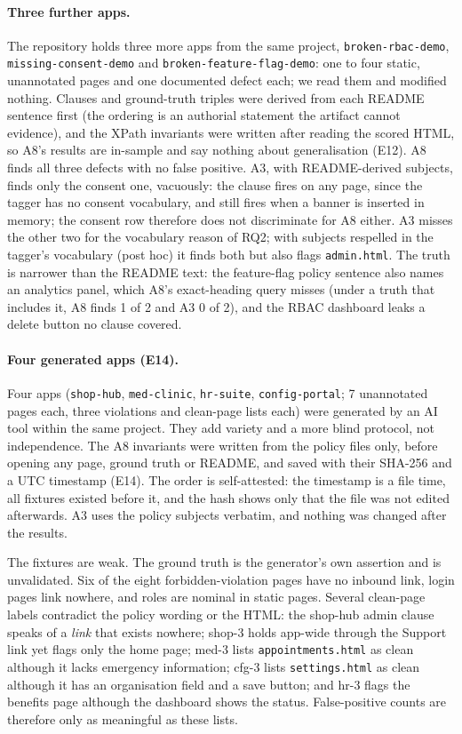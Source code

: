 \paragraph{Three further apps.}
The repository holds three more apps from the same project,
\texttt{broken-rbac-demo}, \texttt{missing-consent-demo} and
\texttt{broken-feature-flag-demo}: one to four static, unannotated pages and one
documented defect each; we read them and modified nothing. Clauses and
ground-truth triples were derived from each README sentence first (the ordering is
an authorial statement the artifact cannot evidence), and the XPath invariants were
written after reading the scored HTML, so A8's results are in-sample and say nothing
about generalisation (E12). A8 finds all three defects with no false positive. A3,
with README-derived subjects, finds only the consent one, vacuously: the clause
fires on any page, since the tagger has no consent vocabulary, and still fires when
a banner is inserted in memory; the consent row therefore does not discriminate for
A8 either. A3 misses the other two for the vocabulary reason of RQ2; with subjects
respelled in the tagger's vocabulary (post hoc) it finds both but also flags
\texttt{admin.html}. The truth is narrower than the README text: the feature-flag
policy sentence also names an analytics panel, which A8's exact-heading query
misses (under a truth that includes it, A8 finds 1 of 2 and A3 0 of 2), and the RBAC
dashboard leaks a delete button no clause covered.

\paragraph{Four generated apps (E14).}
Four apps (\texttt{shop-hub}, \texttt{med-clinic}, \texttt{hr-suite},
\texttt{config-portal}; 7 unannotated pages each, three violations and clean-page
lists each) were generated by an AI tool within the same project. They add variety
and a more blind protocol, not independence. The A8 invariants were written from the
policy files only, before opening any page, ground truth or README, and saved with
their SHA-256 and a UTC timestamp (E14). The order is self-attested: the timestamp is
a file time, all fixtures existed before it, and the hash shows only that the file
was not edited afterwards. A3 uses the policy subjects verbatim, and nothing was
changed after the results.

The fixtures are weak. The ground truth is the generator's own assertion and is
unvalidated. Six of the eight forbidden-violation pages have no inbound link, login
pages link nowhere, and roles are nominal in static pages. Several clean-page labels
contradict the policy wording or the HTML: the shop-hub admin clause speaks of a
\emph{link} that exists nowhere; shop-3 holds app-wide through the Support link yet
flags only the home page; med-3 lists \texttt{appointments.html} as clean although
it lacks emergency information; cfg-3 lists \texttt{settings.html} as clean although
it has an organisation field and a save button; and hr-3 flags the benefits page
although the dashboard shows the status. False-positive counts are therefore only as
meaningful as these lists.

